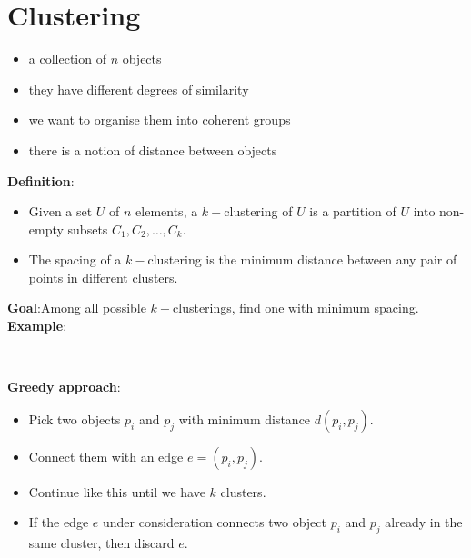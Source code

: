 \documentclass[onecolumn]{report}
\begin{document}
\section{Clustering}
\begin{itemize}
    \item a collection of $n$ objects
    \item they have different degrees of similarity
    \item we want to organise them into coherent groups
    \item there is a notion of distance between objects
\end{itemize}
\noindent
\textbf{Definition}:
\begin{itemize}
    \item Given a set $U$ of $n$ elements, a $k-$clustering of $U$ is a partition of $U$ into non-empty subsets $C_1,C_2,\dots,C_k$.
    \item The spacing of a $k-$clustering is the minimum distance between any pair of points in different clusters.
\end{itemize}
\textbf{Goal}:Among all possible $k-$clusterings, find one with minimum spacing.\\
\textbf{Example}:\\
\begin{center}
\\
\end{center}
\textbf{Greedy approach}:\\
\begin{itemize}
    \item Pick two objects $p_i$ and $p_j$ with minimum distance $d(p_i,p_j)$.
    \item Connect them with an edge $e=(p_i,p_j)$.
    \item Continue like this until we have $k$ clusters.
    \item If the edge $e$ under consideration connects two object $p_i$ and $p_j$ already in the same cluster, then discard $e$.
\end{itemize}
\end{document}
